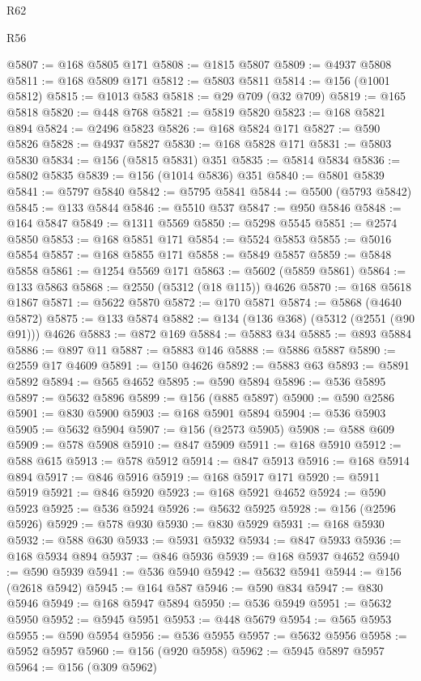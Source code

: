 \begin{lexlean}{R62}
\begin{lexlean}{R56}
\begin{coremodule}
{{{{{{{{{{{{{{{{{{{{{{{{{{{{{{{{{{{{{{{{{{{{{{{{{{{{{{{{{{{{{{{{{{{{{{{{{{{{{{{{{{{{{{{{{{{{{{{{{{{{{{{{{{{{{{{{{{{{{{{{{{{{{{{{{{{{{{{{{{{{{{{{{{{{{{{{{{{{{{{{{{{{{{{{{{{{{{{{{{{{{{{{{{{{{{{{{{{{{{{{{{{{{{{{{{{@5807 := @168 @5805 @171
@5808 := @1815 @5807
@5809 := @4937 @5808
@5811 := @168 @5809 @171
@5812 := @5803 @5811
@5814 := @156 (@1001 @5812)
@5815 := @1013 @583
@5818 := @29 @709 (@32 @709)
@5819 := @165 @5818
@5820 := @448 @768
@5821 := @5819 @5820
@5823 := @168 @5821 @894
@5824 := @2496 @5823
@5826 := @168 @5824 @171
@5827 := @590 @5826
@5828 := @4937 @5827
@5830 := @168 @5828 @171
@5831 := @5803 @5830
@5834 := @156 (@5815 @5831) @351
@5835 := @5814 @5834
@5836 := @5802 @5835
@5839 := @156 (@1014 @5836) @351
@5840 := @5801 @5839
@5841 := @5797 @5840
@5842 := @5795 @5841
@5844 := @5500 (@5793 @5842)
@5845 := @133 @5844
@5846 := @5510 @537
@5847 := @950 @5846
@5848 := @164 @5847
@5849 := @1311 @5569
@5850 := @5298 @5545
@5851 := @2574 @5850
@5853 := @168 @5851 @171
@5854 := @5524 @5853
@5855 := @5016 @5854
@5857 := @168 @5855 @171
@5858 := @5849 @5857
@5859 := @5848 @5858
@5861 := @1254 @5569 @171
@5863 := @5602 (@5859 @5861)
@5864 := @133 @5863
@5868 := @2550 (@5312 (@18 @115)) @4626
@5870 := @168 @5618 @1867
@5871 := @5622 @5870
@5872 := @170 @5871
@5874 := @5868 (@4640 @5872)
@5875 := @133 @5874
@5882 := @134 (@136 @368) (@5312 (@2551 (@90 @91))) @4626
@5883 := @872 @169
@5884 := @5883 @34
@5885 := @893 @5884
@5886 := @897 @11
@5887 := @5883 @146
@5888 := @5886 @5887
@5890 := @2559 @17 @4609
@5891 := @150 @4626
@5892 := @5883 @63
@5893 := @5891 @5892
@5894 := @565 @4652
@5895 := @590 @5894
@5896 := @536 @5895
@5897 := @5632 @5896
@5899 := @156 (@885 @5897)
@5900 := @590 @2586
@5901 := @830 @5900
@5903 := @168 @5901 @5894
@5904 := @536 @5903
@5905 := @5632 @5904
@5907 := @156 (@2573 @5905)
@5908 := @588 @609
@5909 := @578 @5908
@5910 := @847 @5909
@5911 := @168 @5910
@5912 := @588 @615
@5913 := @578 @5912
@5914 := @847 @5913
@5916 := @168 @5914 @894
@5917 := @846 @5916
@5919 := @168 @5917 @171
@5920 := @5911 @5919
@5921 := @846 @5920
@5923 := @168 @5921 @4652
@5924 := @590 @5923
@5925 := @536 @5924
@5926 := @5632 @5925
@5928 := @156 (@2596 @5926)
@5929 := @578 @930
@5930 := @830 @5929
@5931 := @168 @5930
@5932 := @588 @630
@5933 := @5931 @5932
@5934 := @847 @5933
@5936 := @168 @5934 @894
@5937 := @846 @5936
@5939 := @168 @5937 @4652
@5940 := @590 @5939
@5941 := @536 @5940
@5942 := @5632 @5941
@5944 := @156 (@2618 @5942)
@5945 := @164 @587
@5946 := @590 @834
@5947 := @830 @5946
@5949 := @168 @5947 @5894
@5950 := @536 @5949
@5951 := @5632 @5950
@5952 := @5945 @5951
@5953 := @448 @5679
@5954 := @565 @5953
@5955 := @590 @5954
@5956 := @536 @5955
@5957 := @5632 @5956
@5958 := @5952 @5957
@5960 := @156 (@920 @5958)
@5962 := @5945 @5897 @5957
@5964 := @156 (@309 @5962)
}}}}}}}}}}}}}}}}}}}}}}}}}}}}}}}}}}}}}}}}}}}}}}}}}}}}}}}}}}}}}}}}}}}}}}}}}}}}}}}}}}}}}}}}}}}}}}}}}}}}}}}}}}}}}}}}}}}}}}}}}}}}}}}}}}}}}}}}}}}}}}}}}}}}}}}}}}}}}}}}}}}}}}}}}}}}}}}}}}}}}}}}}}}}}}}}}}}}}}}}}}}}}}}}}}}
\end{coremodule}
\end{lexlean}
\end{lexlean}
